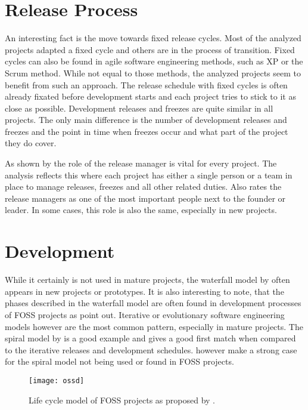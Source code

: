 
\section{Release Process} %

An interesting fact is the move towards fixed release cycles. Most of the
analyzed projects adapted a fixed cycle and others are in the process of
transition. Fixed cycles can also be found in agile software engineering
methods, such as \acl{XP} or the Scrum method. While not equal to those
methods, the analyzed projects seem to benefit from such an approach. The
release schedule with fixed cycles is often already fixated before development
starts and each project tries to stick to it as close as possible. Development
releases and freezes are quite similar in all projects. The only main
difference is the number of development releases and freezes and the point in
time when freezes occur and what part of the project they do cover.

As shown by \textcite{Mockus2002} the role of the release manager is vital for
every project. The analysis reflects this where each project has either a
single person or a team in place to manage releases, freezes and all other
related duties. Also \textcite{Crowston2005} rates the release managers as one
of the most important people next to the founder or leader. In some cases, this
role is also the same, especially in new projects.


\section{Development} %

While it certainly is not used in mature projects, the waterfall model by
\textcite{Royce1970} often appears in new projects or prototypes. It is also
interesting to note, that the phases described in the waterfall model are often
found in development processes of \ac{FOSS} projects as \textcite{Roets2007}
point out. Iterative or evolutionary software engineering models however are
the most common pattern, especially in mature projects. The spiral model by
\textcite{Boehm1988} is a good example and gives a good first match when
compared to the iterative releases and development schedules.
\textcite{Roets2007} however make a strong case for the spiral model not being
used or found in \ac{FOSS} projects.

\begin{figure}[htbp]
  \centering
  \texttt{[image: ossd]}
  \caption[Life Cycle Model of \acl{FOSS} Projects]
  {Life cycle model of \acl{FOSS} projects as proposed by \textcite{Roets2007}.}
\end{figure}

